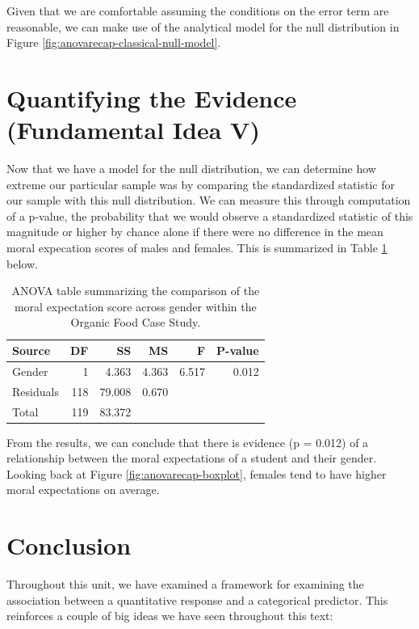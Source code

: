\documentclass[]{book}
\theoremstyle{plain}
\theoremstyle{mydefn}
\theoremstyle{myexmpl}
\theoremstyle{remark}
\begin{document}
Given that we are comfortable assuming the conditions on the error term
are reasonable, we can make use of the analytical model for the null
distribution in Figure \ref{fig:anovarecap-classical-null-model}.

\section{Quantifying the Evidence (Fundamental Idea
V)}\label{quantifying-the-evidence-fundamental-idea-v-1}

Now that we have a model for the null distribution, we can determine how
extreme our particular sample was by comparing the standardized
statistic for our sample with this null distribution. We can measure
this through computation of a p-value, the probability that we would
observe a standardized statistic of this magnitude or higher by chance
alone if there were no difference in the mean moral expecation scores of
males and females. This is summarized in Table
\ref{tab:anovarecap-anova-table} below.

\begin{table}

\caption{\label{tab:anovarecap-anova-table}ANOVA table summarizing the comparison of the moral expectation score across gender within the Organic Food Case Study.}
\centering
\begin{tabular}[t]{l|r|r|r|r|r}
\hline
Source & DF & SS & MS & F & P-value\\
\hline
Gender & 1 & 4.363 & 4.363 & 6.517 & 0.012\\
\hline
Residuals & 118 & 79.008 & 0.670 &  & \\
\hline
Total & 119 & 83.372 &  &  & \\
\hline
\end{tabular}
\end{table}

From the results, we can conclude that there is evidence (p = 0.012) of
a relationship between the moral expectations of a student and their
gender. Looking back at Figure \ref{fig:anovarecap-boxplot}, females
tend to have higher moral expectations on average.

\section{Conclusion}\label{conclusion}

Throughout this unit, we have examined a framework for examining the
association between a quantitative response and a categorical predictor.
This reinforces a couple of big ideas we have seen throughout this text:
\end{document}
